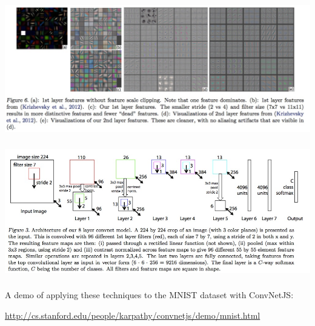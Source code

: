 \documentclass[xetex,mathserif,serif,aspectratio=169]{beamer}
\begin{document}
\begin{frame}[fragile] \frametitle{} \oldB \small

\begin{center}
\includegraphics[width=\textwidth]{img/vizFeatureClip.jpg}
\end{center}

\end{frame}

\begin{frame}[fragile] \frametitle{} \oldB \small

\begin{center}
\includegraphics[width=\textwidth]{img/vizModel.jpg}
\end{center}

\end{frame}

\begin{frame}[fragile] \frametitle{} \oldB \small

A demo of applying these techniques to the MNIST dataset with ConvNetJS:

\begin{center}
\url{http://cs.stanford.edu/people/karpathy/convnetjs/demo/mnist.html}
\end{center}

\end{frame}
\end{document}
